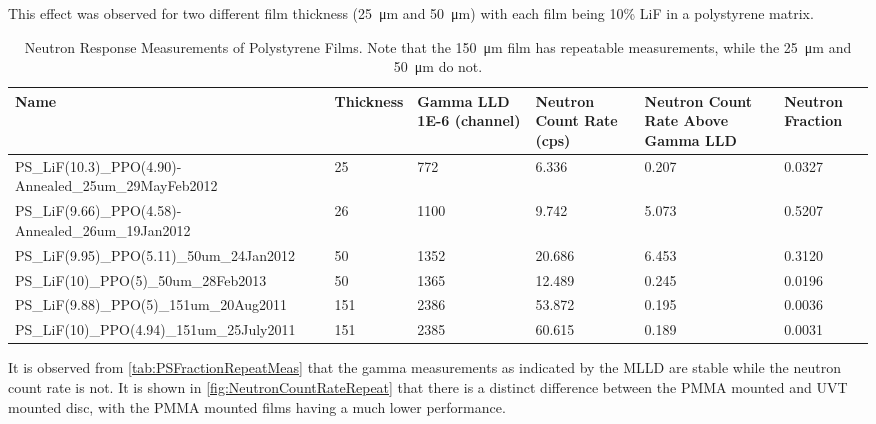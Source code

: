 \documentclass[draftcls,onecolumn]{IEEEtran}
\begin{document}
This effect was observed for two different film thickness (\SI{25}{\um} and \SI{50}{\um}) with each film being 10\% LiF in a polystyrene matrix.
\begin{table}
	\centering
	\caption[PS Film Neutron Fraction Measurements]{Neutron Response Measurements of Polystyrene Films.  Note that the \SI{150}{\um} film has repeatable measurements, while the \SI{25}{\um} and \SI{50}{\um} do not.}
	\label{tab:PSFractionRepeatMeas}
\begin{tabular}{p{5.5cm} | m{1cm} m{1.5cm} m{1.5cm} m{2cm} m{2cm}}
\toprule
Name&Thickness&Gamma LLD \num{1E-6} (channel) & Neutron Count Rate (cps) & Neutron Count Rate Above Gamma LLD & Neutron Fraction\\
\midrule
PS\_LiF(10.3)\_PPO(4.90)-Annealed\_25um\_29MayFeb2012 & 25 & 772&6.336&0.207&0.0327 \\
PS\_LiF(9.66)\_PPO(4.58)-Annealed\_26um\_19Jan2012    & 26&1100&9.742&5.073&0.5207 \\
\hline
PS\_LiF(9.95)\_PPO(5.11)\_50um\_24Jan2012             &50&1352&20.686&6.453&0.3120 \\
PS\_LiF(10)\_PPO(5)\_50um\_28Feb2013		  &50&1365&12.489&0.245&0.0196 \\
\hline
PS\_LiF(9.88)\_PPO(5)\_151um\_20Aug2011	          &151&2386&53.872&0.195&0.0036 \\
PS\_LiF(10)\_PPO(4.94)\_151um\_25July2011	          &151&2385&60.615&0.189&0.0031 \\
\end{tabular}
\end{table}
It is observed from \autoref{tab:PSFractionRepeatMeas} that the gamma measurements as indicated by the MLLD are stable while the neutron count rate is not. 
It is shown in \autoref{fig:NeutronCountRateRepeat} that there is a distinct difference between the PMMA mounted and UVT mounted disc, with the PMMA mounted films having a much lower performance.
\end{document}

